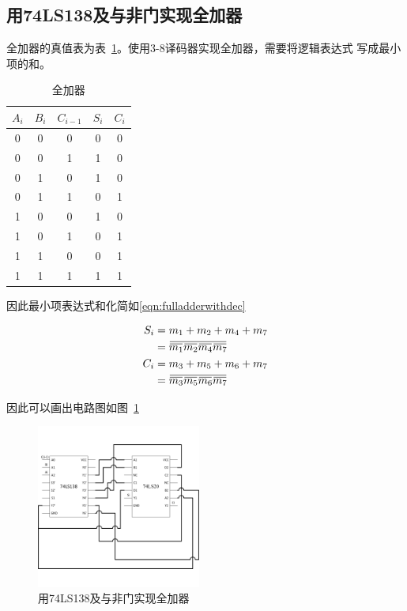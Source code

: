 \documentclass[a4paper,twoside]{ctexart}
\newcommand{\ols}[1]{\mskip.5\thinmuskip\overline{\mskip-.5\thinmuskip {#1} \mskip-.5\thinmuskip}\mskip.5\thinmuskip}
\begin{document}
\begin{spacing}{1.2}
\subsection{用74LS138及与非门实现全加器}

全加器的真值表为表~\ref{tbl:fulladder}。使用3-8译码器实现全加器，需要将逻辑表达式
写成最小项的和。

\begin{table}[htbp]
	\centering
	\caption{全加器}
	\label{tbl:fulladder}
	\begin{tabular}{ccc|cc}
		\toprule
		\hline
		$A_i$&$B_i$&$C_{i-1}$&$S_i$&$C_i$\\
		\hline
		0&0&0&0&0\\
		0&0&1&1&0\\
		0&1&0&1&0\\
		0&1&1&0&1\\
		1&0&0&1&0\\
		1&0&1&0&1\\
		1&1&0&0&1\\
		1&1&1&1&1\\
		\hline
		\bottomrule
	\end{tabular}
\end{table}

因此最小项表达式和化简如\eqref{eqn:fulladderwithdec}

\begin{equation}
	\label{eqn:fulladderwithdec}
	\begin{aligned}
		S_i&=m_1+m_2+m_4+m_7\\
		&=\ols{\ols{m_1}\ols{m_2}\ols{m_4}\ols{m_7}}\\
		C_i&=m_3+m_5+m_6+m_7\\
		&=\ols{\ols{m_3}\ols{m_5}\ols{m_6}\ols{m_7}}\\
	\end{aligned}
\end{equation}

因此可以画出电路图如图~\ref{fig:fulladder138}

\begin{figure}[htbp]
	\centering
	\caption{用74LS138及与非门实现全加器}
	\label{fig:fulladder138}
	\includegraphics[width=0.48\textwidth]{images/42.png}
\end{figure}


\end{spacing}
\end{document}
